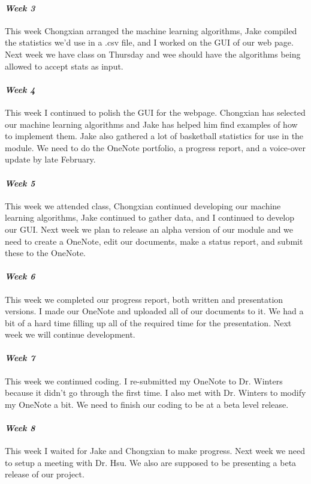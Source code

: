 \documentclass[onecolumn, draftclsnofoot,10pt, compsoc]{IEEEtran}
\begin{document}
\paragraph{\emph{Week 3}}
This week Chongxian arranged the machine learning algorithms, Jake compiled the statistics we'd use in a .csv file, and I worked on the GUI of our web page. Next week we have class on Thursday and wee should have the algorithms being allowed to accept stats as input.
\paragraph{\emph{Week 4}}
This week I continued to polish the GUI for the webpage. Chongxian has selected our machine learning algorithms and Jake has helped him find examples of how to implement them. Jake also gathered a lot of basketball statistics for use in the module. We need to do the OneNote portfolio, a progress report, and a voice-over update by late February.
\paragraph{\emph{Week 5}}
This week we attended class, Chongxian continued developing our machine learning algorithms, Jake continued to gather data, and I continued to develop our GUI. Next week we plan to release an alpha version of our module and we need to create a OneNote, edit our documents, make a status report, and submit these to the OneNote.
\paragraph{\emph{Week 6}}
This week we completed our progress report, both written and presentation versions. I made our OneNote and uploaded all of our documents to it. We had a bit of a hard time filling up all of the required time for the presentation. Next week we will continue development.
\paragraph{\emph{Week 7}}
This week we continued coding. I re-submitted my OneNote to Dr. Winters because it didn't go through the first time. I also met with Dr. Winters to modify my OneNote a bit. We need to finish our coding to be at a beta level release.
\paragraph{\emph{Week 8}}
This week I waited for Jake and Chongxian to make progress. Next week we need to setup a meeting with Dr. Hsu. We also are supposed to be presenting a beta release of our project.
\end{document}
